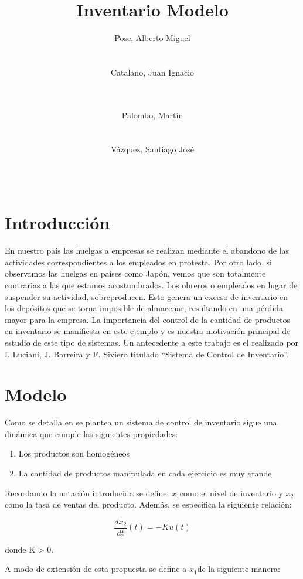 \documentclass{sig-alternate}
\title{Inventario Modelo}
\author{
\alignauthor
Pose, Alberto Miguel\\
       \affaddr{Instituto Tecnológico de Buenos Aires}\\
       \affaddr{Buenos Aires, Argentina}\\
       \email{apose@alu.itba.edu.ar}
\alignauthor
Catalano, Juan Ignacio\\
       \affaddr{Instituto Tecnológico de Buenos Aires}\\
       \affaddr{Buenos Aires, Argentina}\\
       \email{jcatalan@alu.itba.edu.ar}
\and
\alignauthor 
Palombo, Martín\\
       \affaddr{Instituto Tecnológico de Buenos Aires}\\
       \affaddr{Buenos Aires, Argentina}\\
       \email{mpalombo@alu.itba.edu.ar}
\alignauthor 
Vázquez, Santiago José\\
       \affaddr{Instituto Tecnológico de Buenos Aires}\\
       \affaddr{Buenos Aires, Argentina}\\
       \email{savazque@alu.itba.edu.ar}
}
\date{}
\begin{document}
\maketitle

\begin{abstract}

\end{abstract}

\section{Introducción}
En nuestro país las huelgas a empresas se realizan mediante el abandono de las actividades correspondientes a los empleados en protesta. Por otro
lado, si observamos las huelgas en países como Japón, vemos que son totalmente contrarias a las que estamos acostumbrados. Los obreros o empleados
en lugar de suspender su actividad, sobreproducen. Esto genera un exceso de inventario en los depósitos que se torna imposible de almacenar,
resultando en una pérdida mayor para la empresa. La importancia del control de la cantidad de productos en inventario se manifiesta en este
ejemplo y es nuestra motivación principal de estudio de este tipo de sistemas. Un antecedente a este trabajo es el realizado por I. Luciani, J. Barreira y
F. Siviero titulado ``Sistema de Control de Inventario''.\\ %

\section{Modelo}
Como se detalla en se plantea un sistema de control
de inventario sigue una dinámica que cumple las siguientes propiedades:
\begin{enumerate}
\item Los productos son homogéneos
\item La cantidad de productos manipulada en cada ejercicio es muy grande
\end{enumerate}
Recordando la notación introducida se define: $x_{1}$como el nivel
de inventario y $x_{2}$como la tasa de ventas del producto. Además,
se especifica la siguiente relación:

\begin{equation}
\frac{dx_{2}}{dt}(t)=-Ku(t)\label{eq:la_k}\end{equation}


donde K > 0.

A modo de extensión de esta propuesta se define a $\dot{x_{1}}$de
la siguiente manera:
\end{document}

